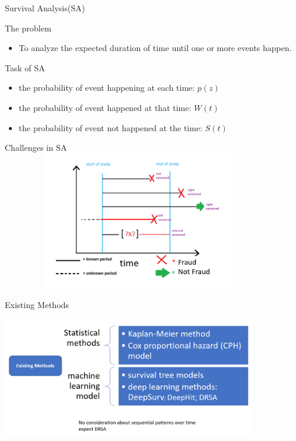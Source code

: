 \begin{frame}{Survival Analysis(SA)}
	
	\begin{alertblock}{The problem}
		
		\begin{itemize}
			\item To analyze the expected duration of time until one or more events happen.
		\end{itemize}
		
	\end{alertblock}
	
	\begin{block}{Task of SA}
		
		\begin{itemize}
			\item
			the probability of event happening at each time: $p(z)$
			\item
		     the probability of event happened at that time: $W(t)$
			\item
			the probability of event not happened at the time: $S(t)$
		\end{itemize}
		
	\end{block}
	
\end{frame}

\begin{frame}{Challenges in SA}
	\includegraphics[width=12cm, height=6cm, scale=0.4]{images/01.png}

	
\end{frame}

\begin{frame}{Existing Methods}
	\includegraphics[width=11cm, height=6cm, scale=0.4]{images/02.png}

	
\end{frame}

